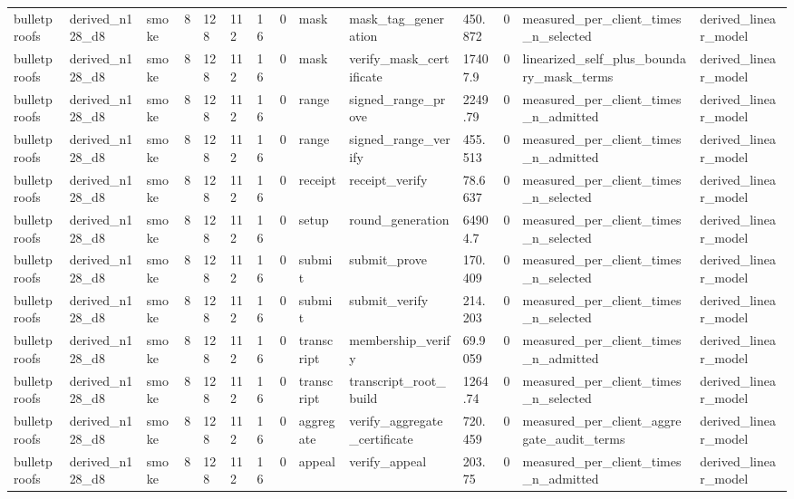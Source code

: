 \begin{table}[t]
\begin{tabular}{llllllllllllll}
bulletproofs & derived\_n128\_d8 & smoke & 8 & 128 & 112 & 16 & 0 & mask & mask\_tag\_generation & 450.872 & 0 & measured\_per\_client\_times\_n\_selected & derived\_linear\_model \\
bulletproofs & derived\_n128\_d8 & smoke & 8 & 128 & 112 & 16 & 0 & mask & verify\_mask\_certificate & 17407.9 & 0 & linearized\_self\_plus\_boundary\_mask\_terms & derived\_linear\_model \\
bulletproofs & derived\_n128\_d8 & smoke & 8 & 128 & 112 & 16 & 0 & range & signed\_range\_prove & 2249.79 & 0 & measured\_per\_client\_times\_n\_admitted & derived\_linear\_model \\
bulletproofs & derived\_n128\_d8 & smoke & 8 & 128 & 112 & 16 & 0 & range & signed\_range\_verify & 455.513 & 0 & measured\_per\_client\_times\_n\_admitted & derived\_linear\_model \\
bulletproofs & derived\_n128\_d8 & smoke & 8 & 128 & 112 & 16 & 0 & receipt & receipt\_verify & 78.6637 & 0 & measured\_per\_client\_times\_n\_selected & derived\_linear\_model \\
bulletproofs & derived\_n128\_d8 & smoke & 8 & 128 & 112 & 16 & 0 & setup & round\_generation & 64904.7 & 0 & measured\_per\_client\_times\_n\_selected & derived\_linear\_model \\
bulletproofs & derived\_n128\_d8 & smoke & 8 & 128 & 112 & 16 & 0 & submit & submit\_prove & 170.409 & 0 & measured\_per\_client\_times\_n\_selected & derived\_linear\_model \\
bulletproofs & derived\_n128\_d8 & smoke & 8 & 128 & 112 & 16 & 0 & submit & submit\_verify & 214.203 & 0 & measured\_per\_client\_times\_n\_selected & derived\_linear\_model \\
bulletproofs & derived\_n128\_d8 & smoke & 8 & 128 & 112 & 16 & 0 & transcript & membership\_verify & 69.9059 & 0 & measured\_per\_client\_times\_n\_admitted & derived\_linear\_model \\
bulletproofs & derived\_n128\_d8 & smoke & 8 & 128 & 112 & 16 & 0 & transcript & transcript\_root\_build & 1264.74 & 0 & measured\_per\_client\_times\_n\_selected & derived\_linear\_model \\
bulletproofs & derived\_n128\_d8 & smoke & 8 & 128 & 112 & 16 & 0 & aggregate & verify\_aggregate\_certificate & 720.459 & 0 & measured\_per\_client\_aggregate\_audit\_terms & derived\_linear\_model \\
bulletproofs & derived\_n128\_d8 & smoke & 8 & 128 & 112 & 16 & 0 & appeal & verify\_appeal & 203.75 & 0 & measured\_per\_client\_times\_n\_admitted & derived\_linear\_model \\

\end{tabular}
\end{table}
